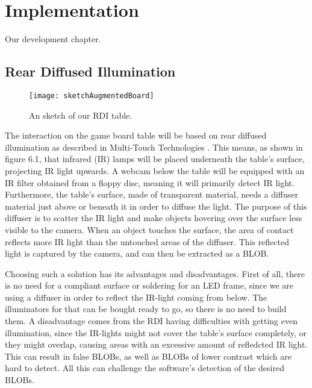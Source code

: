 \chapter{Implementation}\label{ch:implementation}
Our development chapter. 

\section{Rear Diffused Illumination} \label{sec:RDI}
\begin{figure}[!h]
\centering	\texttt{[image: sketchAugmentedBoard]}
\label{Fig:sketch} \caption{An sketch of our RDI table.}
\end{figure}
The interaction on the game board table will be based on rear diffused illumination as described in Multi-Touch Technologies \citep{multiTT}. This means, as shown in figure 6.1, that infrared (IR) lamps will be placed underneath the table's surface, projecting IR light upwards. A webcam below the table will be equipped with an IR filter obtained from a floppy disc, meaning it will primarily detect IR light. Furthermore, the table's surface, made of transparent material, needs a diffuser material just above or beneath it in order to diffuse the light. The purpose of this diffuser is to scatter the IR light and make objects hovering over the surface less visible to the camera. When an object touches the surface, the area of contact reflects more IR light than the untouched areas of the diffuser. This reflected light is captured by the camera, and can then be extracted as a BLOB.

Choosing such a solution has its advantages and disadvantages. First of all, there is no need for a compliant surface or soldering for an LED frame, since we are using a diffuser in order to reflect the IR-light coming from below. The illuminators for that can be bought ready to go, so there is no need to build them. A disadvantage comes from the RDI having difficulties with getting even illumination, since the IR-lights might not cover the table's surface completely, or they might overlap, causing areas with an excessive amount of refledcted IR light. This can result in false BLOBs, as well as BLOBs of lower contrast which are hard to detect. All this can challenge the software's detection of the desired BLOBs.

